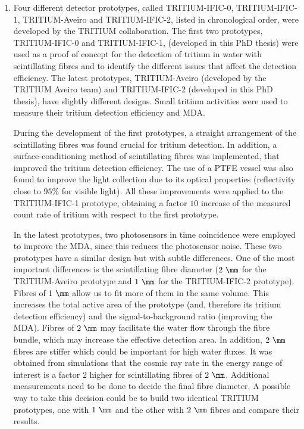 \begin{enumerate}

\item{} Four different detector prototypes, called TRITIUM-IFIC-0, TRITIUM-IFIC-1, TRITIUM-Aveiro and TRITIUM-IFIC-2, listed in chronological order, were developed by the TRITIUM collaboration. The first two prototypes, TRITIUM-IFIC-0 and TRITIUM-IFIC-1, (developed in this PhD thesis) were used as a proof of concept for the detection of tritium in water with scintillating fibres and to identify the different issues that affect the detection efficiency. The latest prototypes, TRITIUM-Aveiro (developed by the TRITIUM Aveiro team) and TRITIUM-IFIC-2 (developed in this PhD thesis), have slightly different designs. Small tritium activities were used to measure their tritium detection efficiency and MDA. %

During the development of the first prototypes, a straight arrangement of the scintillating fibres was found crucial for tritium detection. In addition, a surface-conditioning method of scintillating fibres was implemented, that improved the tritium detection efficiency. The use of a PTFE vessel was also found to improve the light collection due to its optical properties (reflectivity close to $95\%$ for visible light). All these improvements were applied to the TRITIUM-IFIC-1 prototype, obtaining a factor $10$ increase of the measured count rate of tritium with respect to the first prototype. %

In the latest prototypes, two photosensors in time coincidence were employed to improve the MDA, since this reduces the photosensor noise. These two prototypes have a similar design but with subtle differences. One of the most important differences is the scintillating fibre diameter ($2~\mm$ for the TRITIUM-Aveiro prototype and $1~\mm$ for the TRITIUM-IFIC-2 prototype). Fibres of $1~\mm$ allow us to fit more of them in the same volume. This increases the total active area of the prototype (and, therefore its tritium detection efficiency) and the signal-to-background ratio (improving the MDA). Fibres of $2~\mm$ may facilitate the water flow through the fibre bundle, which may increase the effective detection area. In addition, $2~\mm$ fibres are stiffer which could be important for high water fluxes. It was obtained from simulations that the cosmic ray rate in the energy range of interest is a factor $2$ higher for scintillating fibres of $2~\mm$. Additional measurements need to be done to decide the final fibre diameter. A possible way to take this decision could be to build two identical TRITIUM prototypes, one with $1~\mm$ and the other with $2~\mm$ fibres and compare their results. 


\end{enumerate}
